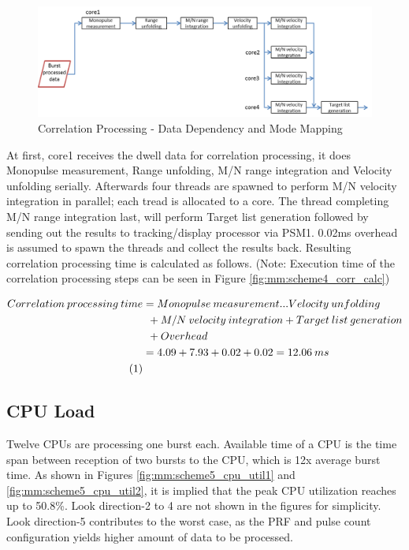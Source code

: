 \begin{figure}[h!]
	\centering
	\includegraphics[width=140mm]{figures/scheme5_corr_data_path}
	\caption{Correlation Processing - Data Dependency and Mode Mapping}
	\label{fig:mm:scheme5_corr_data_path}
\end{figure}
At first, core1 receives the dwell data for correlation processing, it does Monopulse measurement, Range unfolding, M/N range integration and Velocity unfolding serially. Afterwards four threads are spawned to perform M/N velocity integration in parallel; each tread is allocated to a core. The thread completing M/N range integration last, will perform Target list generation followed by sending out the results to tracking/display processor via PSM1. 0.02ms overhead is assumed to spawn the threads and collect the results back. Resulting correlation processing time is calculated as follows. (Note: Execution time of the correlation processing steps can be seen in Figure \ref{fig:mm:scheme4_corr_calc})

\begin{align*}
\label{aa:scheme5:corr}
	Correlation \: processing \: time &= Monopulse \: measurement...Velocity \: unfolding  \\
	& \: \: + M/N \: velocity \: integration + Target \: list \: generation \\
	& \: \: + Overhead \\
	&= 4.09 + 7.93 + 0.02 + 0.02 = 12.06 \: ms \\ \stepcounter{equation}\tag{\theequation} 
\end{align*}

\subsection{CPU Load}
\label{ss:mm:scheme5:cpu_load}
Twelve CPUs are processing one burst each. Available time of a CPU is the time span between reception of two bursts to the CPU, which is 12x average burst time. As shown in Figures \ref{fig:mm:scheme5_cpu_util1} and \ref{fig:mm:scheme5_cpu_util2}, it is implied that the peak CPU utilization reaches up to 50.8\%. Look direction-2 to 4 are not shown in the figures for simplicity. Look direction-5 contributes to the worst case, as the PRF and pulse count configuration yields higher amount of data to be processed.

